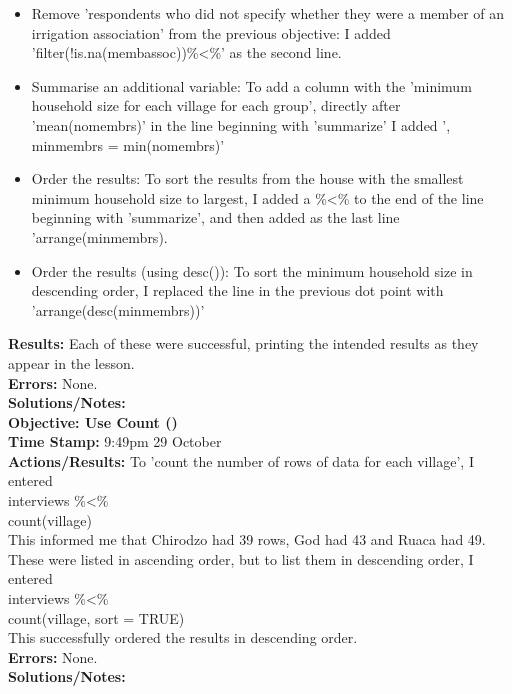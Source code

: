 \documentclass{article}
\begin{document}
\begin{FlushLeft}
\begin{itemize}
    \item Remove 'respondents who did not specify whether they were a member of an irrigation association' from the previous objective: I added 'filter(!is.na(memb\textunderscore assoc))\%\textless\%' as the second line.
    \item Summarise an additional variable: To add a column with the 'minimum household size for each village for each group', directly after 'mean(no\textunderscore membrs)' in the line beginning with 'summarize' I added ', min\textunderscore membrs = min(no\textunderscore membrs)'
    \item Order the results: To sort the results from the house with the smallest minimum household size to largest, I added a \%\textless\% to the end of the line beginning with 'summarize', and then added as the last line 'arrange(min\textunderscore membrs).
    \item Order the results (using desc()): To sort the minimum household size in descending order, I replaced the line in the previous dot point with 'arrange(desc(min\textunderscore membrs))'
\end{itemize}
\textbf{Results:} Each of these were successful, printing the intended results as they appear in the lesson.\\
\textbf{Errors:} None.\\
\textbf{Solutions/Notes:}\\
\vspace{5mm}
\textbf{Objective: Use Count ()}\\ 
\textbf{Time Stamp:} 9:49pm 29 October\\
\textbf{Actions/Results:} To 'count the number of rows of data for each village', I entered\\
interviews \%\textless\%\\
count(village)\\
This informed me that Chirodzo had 39 rows, God had 43 and Ruaca had 49. These were listed in ascending order, but to list them in descending order, I entered\\
interviews \%\textless\%\\
count(village, sort = TRUE)\\
This successfully ordered the results in descending order.\\
\textbf{Errors:} None.\\
\textbf{Solutions/Notes:}\\
\vspace{5mm}

\end{FlushLeft}
\end{document}
